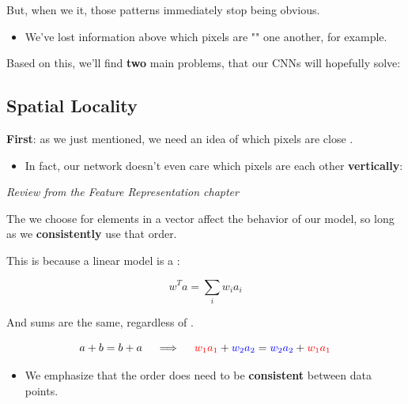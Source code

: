         But, when we  it, those patterns immediately stop being obvious.

        \begin{itemize}
            \item We've lost information above which pixels are "" one another, for example.
        \end{itemize}

        Based on this, we'll find \textbf{two} main problems, that our CNNs will hopefully solve:

    \subsection{Spatial Locality}


        \textbf{First}: as we just mentioned, we need an idea of which pixels are close .

        \begin{itemize}
            \item In fact, our network doesn't even care which pixels are  each other \textbf{vertically}:\\
        \end{itemize}

        \begin{concept}
            \textit{Review from the Feature Representation chapter}
            
            The  we choose for elements in a vector  affect the behavior of our model, so long as we \textbf{consistently} use that order.

            This is because a linear model is a :

            \begin{equation*}
                w^T a = \sum_i w_i a_i 
            \end{equation*}

            And sums are the same, regardless of .

            \begin{equation*}
                a+b=b+a \quad\implies\quad 
                \textcolor{red}{w_1a_1} + \textcolor{blue}{w_2a_2} = \textcolor{blue}{w_2a_2} + \textcolor{red}{w_1a_1} 
            \end{equation*}

            \subsecdiv

            \begin{itemize}
                \item We emphasize that the order does need to be \textbf{consistent} between data points.
            \end{itemize}
        \end{concept}


